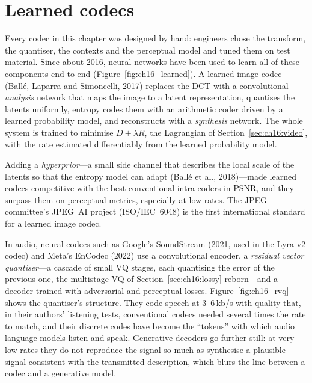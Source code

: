 
\section{Learned codecs}
\label{sec:ch16:neural}


Every codec in this chapter was designed by hand: engineers chose the transform, the quantiser, the
contexts and the perceptual model and tuned them on test material. Since about 2016, neural networks have
been used to learn all of these components end to end (Figure~\ref{fig:ch16_learned}). A learned image
codec (Ball\'e, Laparra and Simoncelli, 2017) replaces the DCT with a convolutional \emph{analysis}
network that maps the image to a latent representation, quantises the latents uniformly, entropy codes
them with an arithmetic coder driven by a learned probability model, and reconstructs with a
\emph{synthesis} network. The whole system is trained to minimise $D+\lambda R$, the Lagrangian of
Section~\ref{sec:ch16:video}, with the rate estimated differentiably from the learned probability model.

Adding a \emph{hyperprior}---a small side channel that describes the local scale of the latents so that
the entropy model can adapt (Ball\'e et al., 2018)---made learned codecs competitive with the best
conventional intra coders in PSNR, and they surpass them on perceptual metrics, especially at low rates.
The JPEG committee's JPEG~AI project (ISO/IEC~6048) is the first international standard for a learned
image codec.


In audio, neural codecs such as Google's SoundStream (2021, used in the Lyra v2 codec) and Meta's EnCodec
(2022) use a convolutional encoder, a \emph{residual vector quantiser}---a cascade of small VQ stages, each
quantising the error of the previous one, the multistage VQ of Section~\ref{sec:ch16:lossy} reborn---and a
decoder trained with adversarial and perceptual losses. Figure~\ref{fig:ch16_rvq} shows the quantiser's structure. They code speech at 3--6\,kb/s with quality that, in their
authors' listening tests, conventional codecs needed several times the rate to match, and their discrete codes have become the
``tokens'' with which audio language models listen and speak. Generative decoders go further still: at very
low rates they do not reproduce the signal so much as synthesise a plausible signal consistent with the
transmitted description, which blurs the line between a codec and a generative model.

